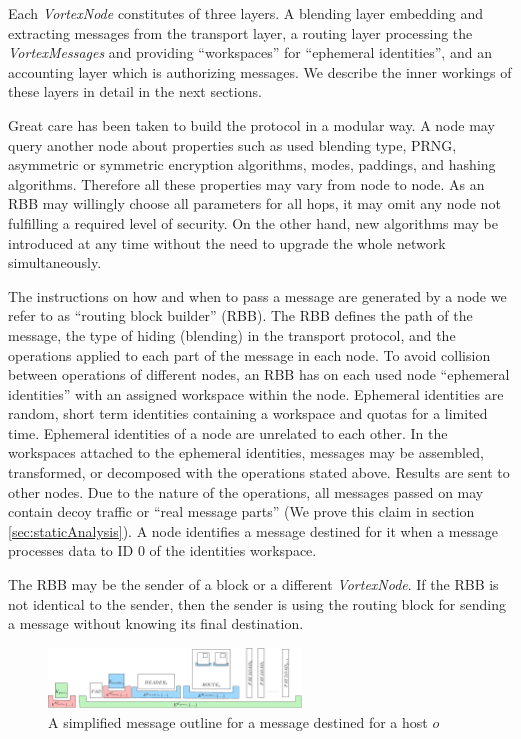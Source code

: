 \documentclass[acmsmall, screen]{acmart}
\begin{document}
Each \emph{VortexNode} constitutes of three layers. A blending layer embedding and extracting messages from the transport layer, a routing layer processing the \emph{VortexMessages} and providing ``workspaces'' for ``ephemeral identities'', and an accounting layer which is authorizing messages. We describe the inner workings of these layers in detail in the next sections.

Great care has been taken to build the protocol in a modular way. A node may query another node about properties such as used blending type, PRNG, asymmetric or symmetric encryption algorithms, modes, paddings, and hashing algorithms. Therefore all these properties may vary from node to node. As an RBB may willingly choose all parameters for all hops, it may omit any node not fulfilling a required level of security. On the other hand, new algorithms may be introduced at any time without the need to upgrade the whole network simultaneously. 

The instructions on how and when to pass a message are generated by a node we refer to as ``routing block builder'' (RBB). The RBB defines the path of the message, the type of hiding (blending) in the transport protocol, and the operations applied to each part of the message in each node. To avoid collision between operations of different nodes, an RBB has on each used node ``ephemeral identities'' with an assigned workspace within the node. Ephemeral identities are random, short term identities containing a workspace and quotas for a limited time. Ephemeral identities of a node are unrelated to each other. In the workspaces attached to the ephemeral identities, messages may be assembled, transformed, or decomposed with the operations stated above. Results are sent to other nodes. Due to the nature of the operations, all messages passed on may contain decoy traffic or ``real message parts'' (We prove this claim in section \ref{sec:staticAnalysis}). A node identifies a message destined for it when a message processes data to ID 0 of the identities workspace.

The RBB may be the sender of a block or a different \emph{VortexNode}. If the RBB is not identical to the sender, then the sender is using the routing block for sending a message without knowing its final destination.

\begin{figure}[ht]
	\centering\includegraphics[width=0.6\textwidth]{blockLayoutSimplified}
	\caption{A simplified message outline for a message destined for a host $o$}
	\label{fig:messageOutline}
\end{figure}
\end{document}
